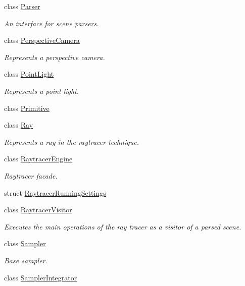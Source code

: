 \begin{DoxyCompactItemize}
class \mbox{\hyperlink{classomg_1_1_parser}{Parser}}
\begin{DoxyCompactList}\small\item\em An interface for scene parsers. \end{DoxyCompactList}\item 
class \mbox{\hyperlink{classomg_1_1_perspective_camera}{Perspective\+Camera}}
\begin{DoxyCompactList}\small\item\em Represents a perspective camera. \end{DoxyCompactList}\item 
class \mbox{\hyperlink{classomg_1_1_point_light}{Point\+Light}}
\begin{DoxyCompactList}\small\item\em Represents a point light. \end{DoxyCompactList}\item 
class \mbox{\hyperlink{classomg_1_1_primitive}{Primitive}}
\item 
class \mbox{\hyperlink{classomg_1_1_ray}{Ray}}
\begin{DoxyCompactList}\small\item\em Represents a ray in the raytracer technique. \end{DoxyCompactList}\item 
class \mbox{\hyperlink{classomg_1_1_raytracer_engine}{Raytracer\+Engine}}
\begin{DoxyCompactList}\small\item\em Raytracer facade. \end{DoxyCompactList}\item 
struct \mbox{\hyperlink{structomg_1_1_raytracer_running_settings}{Raytracer\+Running\+Settings}}
\item 
class \mbox{\hyperlink{classomg_1_1_raytracer_visitor}{Raytracer\+Visitor}}
\begin{DoxyCompactList}\small\item\em Executes the main operations of the ray tracer as a visitor of a parsed scene. \end{DoxyCompactList}\item 
class \mbox{\hyperlink{classomg_1_1_sampler}{Sampler}}
\begin{DoxyCompactList}\small\item\em Base sampler. \end{DoxyCompactList}\item 
class \mbox{\hyperlink{classomg_1_1_sampler_integrator}{Sampler\+Integrator}}

\end{DoxyCompactItemize}
